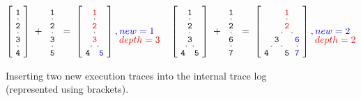 \documentclass[sigconf, anonymous, review]{acmart}
\begin{document}
\begin{figure}[t]
\scriptsize
\newcommand\stacked[2]{\underset{\textstyle #2\mathstrut}{#1}}
\begin{align*}
  \nonumber
  \left[
  \tikz[
    baseline=-8mm,
    level distance=0.5cm,
    level 1/.style={sibling distance=0.5cm},
    level 2/.style={sibling distance=0.5cm}
  ]{
    \node {\small \texttt{1}}
      child {node {\small \texttt{2}}
        child {node {\small \texttt{3}}
          child {node {\small \texttt{4}}}
        }
      }
  }
  \right]
  \;
  +
  \;
  \tikz[
    baseline=-8mm,
    level distance=0.5cm,
    level 1/.style={sibling distance=0.5cm},
    level 2/.style={sibling distance=0.5cm}
  ]{
    \node {\small \texttt{1}}
      child {node {\small \texttt{2}}
        child {node {\small \texttt{3}}
          child {node {\small \texttt{5}}}
        }
      }
  }
  \;
  =
  \;
  \left[
  \tikz[
    baseline=-8mm,
    level distance=0.5cm,
    level 1/.style={sibling distance=0.5cm},
    level 2/.style={sibling distance=0.5cm}
  ]{
    \node {\color{red} \small \texttt{1}}
      child {node {\color{red} \small \texttt{2}}
        child {node {\color{red} \small \texttt{3}}
          child {node {\small \texttt{4}}}
          child {node {\color{blue} \small \texttt{5}}}
        }
      }
  }
  \right]
  ,
  \stacked{{\color{blue} new=1\phantom{x}}}{{\color{red} depth=3}}
  \quad
  \left[
  \tikz[
    baseline=-8mm,
    level distance=0.5cm,
    level 1/.style={sibling distance=0.5cm},
    level 2/.style={sibling distance=0.5cm}
  ]{
    \node {\small \texttt{1}}
      child {node {\small \texttt{2}}
        child {node {\small \texttt{3}}
          child {node {\small \texttt{4}}}
          child {node {\small \texttt{5}}}
        }
      }
  }
  \right]
  \;
  +
  \;
  \tikz[
    baseline=-8mm,
    level distance=0.5cm,
    level 1/.style={sibling distance=0.5cm},
    level 2/.style={sibling distance=0.5cm}
  ]{
    \node {\small \texttt{1}}
      child {node {\small \texttt{2}}
        child {node {\small \texttt{6}}
          child {node {\small \texttt{7}}
          }
        }
      }
  }
  \;
  =
  \;
  \left[
  \tikz[
    baseline=-8mm,
    level distance=0.5cm,
    level 1/.style={sibling distance=0.5cm},
    level 2/.style={sibling distance=0.75cm}
  ]{
    \node {\color{red} \small \texttt{1}}
      child {node {\color{red} \small \texttt{2}}
        child {node {\small \texttt{3}}
          child {node {\small \texttt{4}}}
          child {node {\small \texttt{5}}}
        }
        child {node {\color{blue}\small \texttt{6}}
          child {node {\color{blue}\small \texttt{7}}}
        }
      }
  }
  \right]
  ,
  \stacked{{\color{blue} new=2\phantom{x}}}{{\color{red} depth=2}}
\end{align*}
\vspace{-10pt}
\caption{\label{fig:mutagen:tracelog}Inserting two new execution traces into the
  internal trace log (represented using brackets).}
\end{figure}
\end{document}
